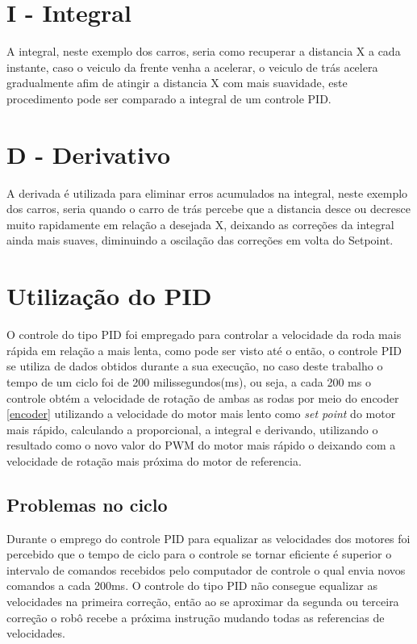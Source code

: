 \documentclass[a4paper,12pt,portuguese]{ufms-cpcx}
\begin{document}
\section{I - Integral}
A integral, neste exemplo dos carros, seria como recuperar a distancia X a cada instante, caso o veiculo da frente venha a acelerar, o veiculo de trás acelera gradualmente afim de atingir a distancia X com mais suavidade, este procedimento pode ser comparado a integral de um controle PID.

\section{D - Derivativo}
A derivada é utilizada para eliminar erros acumulados na integral, neste exemplo dos carros, seria quando o carro de trás percebe que a distancia desce ou decresce muito rapidamente em relação a desejada X, deixando as correções da integral ainda mais suaves, diminuindo a oscilação das correções em volta do Setpoint.

\section{Utilização do PID}
O controle do tipo PID foi empregado para controlar a velocidade da roda mais rápida em relação a mais lenta, como pode ser visto até o então, o controle PID se utiliza de dados obtidos durante a sua execução, no caso deste trabalho o tempo de um ciclo foi de 200 milissegundos(ms), ou seja, a cada 200 ms o controle obtém a velocidade de rotação de ambas as rodas por meio do encoder \ref{encoder} utilizando a velocidade do motor mais lento como \textit{set point} do motor mais rápido, calculando a proporcional, a integral e derivando, utilizando o resultado como o novo valor do PWM do motor mais rápido o deixando com a velocidade de rotação mais próxima do motor de referencia.

\subsection{Problemas no ciclo}
Durante o emprego do controle PID para equalizar as velocidades dos motores foi percebido que o tempo de ciclo para o controle se tornar eficiente é superior o intervalo de comandos recebidos pelo computador de controle o qual envia novos comandos a cada 200ms. O controle do tipo PID não consegue equalizar as velocidades na primeira correção, então ao se aproximar da segunda ou terceira correção o robô recebe a próxima instrução mudando todas as referencias de velocidades.
\end{document}
